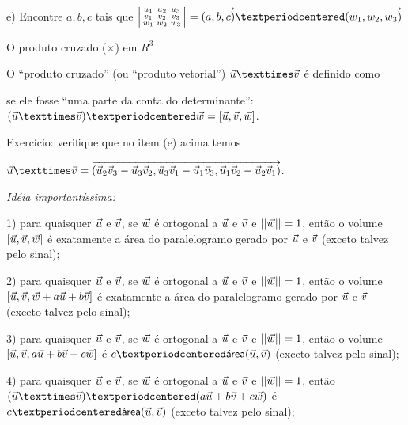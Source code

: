 \documentclass[oneside]{book}
\begin{document}
e) Encontre $a,b,c$ tais que $\vsm{u_1&u_2&u_3 \\ v_1&v_2&v_3 \\ w_1&w_2&w_3 \\}
   = \V(a,b,c)·\V(w_1,w_2,w_3)$




\newpage

%

 {O produto cruzado ($×$) em $R^3$}

\ssk

\def\area{\textsf{área}}

O ``produto cruzado'' (ou ``produto vetorial'') $\uu×\vv$ é definido como

se ele fosse ``uma parte da conta do determinante'': $(\uu×\vv)·\ww = [\uu,\vv,\ww]$.

Exercício: verifique que no item (e) acima temos

$\uu×\vv = \V(\uu_2\vv_3-\uu_3\vv_2, \uu_3\vv_1-\uu_1\vv_3, \uu_1\vv_2-\uu_2\vv_1)$.

\msk

{\sl Idéia importantíssima:}

1) para quaisquer ${\vec u}$ e ${\vec v}$, se ${\vec w}$ é ortogonal a ${\vec u}$ e ${\vec v}$
e $||{\vec w}||=1$, então o volume $[{\vec u},{\vec v},{\vec w}]$ é exatamente a área do
paralelogramo gerado por ${\vec u}$ e ${\vec v}$ (exceto talvez pelo sinal);

2) para quaisquer ${\vec u}$ e ${\vec v}$, se ${\vec w}$ é ortogonal a ${\vec u}$ e ${\vec v}$
e $||{\vec w}||=1$, então o volume $[{\vec u},{\vec v},{\vec w}+a{\vec u}+b{\vec v}]$ é exatamente a
área do paralelogramo gerado por ${\vec u}$ e ${\vec v}$ (exceto talvez pelo
sinal);

3) para quaisquer ${\vec u}$ e ${\vec v}$, se ${\vec w}$ é ortogonal a ${\vec u}$ e ${\vec v}$
e $||{\vec w}||=1$, então o volume $[{\vec u},{\vec v},a{\vec u}+b{\vec v}+c{\vec w}]$ é
$c·\area(\uu,\vv)$ (exceto talvez pelo sinal);

4) para quaisquer ${\vec u}$ e ${\vec v}$, se ${\vec w}$ é ortogonal a ${\vec u}$ e ${\vec v}$
e $||{\vec w}||=1$, então $(\uu×\vv)·(a\uu+b\vv+c\ww)$ é $c·\area(\uu,\vv)$
(exceto talvez pelo sinal);
\end{document}
